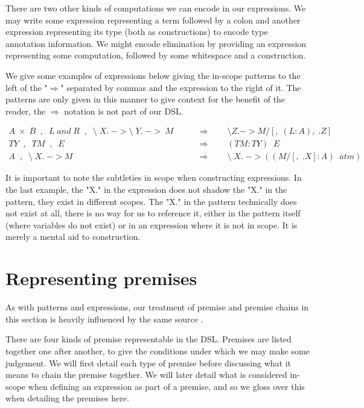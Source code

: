 There are two other kinds of computations we can encode in our
expressions. We may write some expression representing a term followed
by a colon and another expression representing its type (both as constructions)
to encode type annotation information. We might encode elimination by
providing an expression representing some computation, followed by
some whitespace and a construction.

We give some examples of expressions below giving the in-scope patterns
to the left of the "$\Rightarrow$" separated by commas and the
expression to the right of it. The patterns are only given in this
manner to give context for the benefit of the reader, the
$\Rightarrow$ notation is not part of our DSL.

\begin{align*}
  A \; \times \; B \;\; , \;\; L \; and \; R  \;\; , \;\; \mbox{\textbackslash} \;
  X. \; -> \mbox{\textbackslash} \; Y. \; -> \; M \qquad &\Rightarrow
  \qquad \mbox{\textbackslash} Z. -> M/[,\; (L:A),\; .Z]\\
  TY \;\; , \;\; TM \;\; , \;\; E \qquad &\Rightarrow \qquad
  (TM:TY)\;\; E\\
  A \;\; , \;\; \mbox{\textbackslash} \; X. \; -> M \;\; \qquad
  &\Rightarrow \qquad \mbox{\textbackslash} \; X. \; -> ((M/[,\; .X] : A)\;\; atm)
\end{align*}

It is important to note the subtleties in scope when constructing
expressions. In the last example, the "X." in the expression does not
shadow the "X." in the pattern, they exist in different scopes. The
"X." in the pattern technically does not exist at all, there
is no way for us to reference it, either in the pattern itself (where
variables do not exist) or in an expression where it is not in
scope. It is merely a mental aid to construction.

\section{Representing premises}

As with patterns and expressions, our treatment of premise and premise
chains in this section is heavily influenced by the same source
\cite{TypesWhoSayNi}.

There are four kinds of premise representable in the DSL. Premises are
listed together one after another, to give the
conditions under which we may make some judgement. We will first
detail each type of premise before discussing what it means to chain
the premise together. We will later detail what is considered
in-scope when defining an expression as part of a premise, and so we
gloss over this when detailing the premises here.

